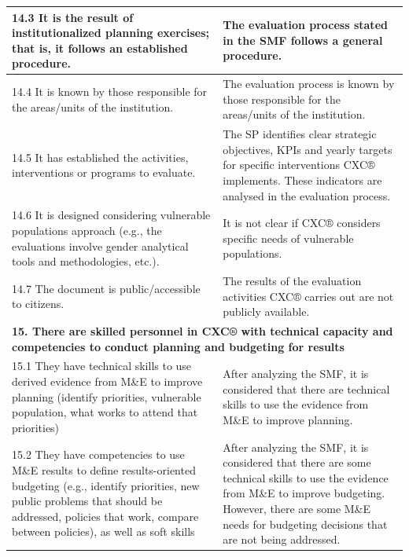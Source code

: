 \documentclass[
  10pt,
]{book}
\begin{document}
\begin{table}
\begin{tabular}[t]{l|l}
\hline
\hspace{1em}14.3 It is the result of institutionalized planning exercises; that is, it follows an established procedure. & The evaluation process stated in the SMF follows a general procedure.\\
\hline
\hspace{1em}14.4 It is known by those responsible for the areas/units of the institution. & The evaluation process is known by those responsible for the areas/units of the institution.\\
\hline
\hspace{1em}14.5 It has established the activities, interventions or programs to evaluate. & The SP identifies clear strategic objectives, KPIs and yearly targets for specific interventions CXC® implements. These indicators are analysed in the evaluation process.\\
\hline
\hspace{1em}14.6 It is designed considering vulnerable populations approach (e.g., the evaluations involve gender analytical tools and methodologies, etc.). & It is not clear if CXC® considers specific needs of vulnerable populations.\\
\hline
\hspace{1em}14.7 The document is public/accessible to citizens. & The results of the evaluation activities CXC® carries out are not publicly available.\\
\hline
\multicolumn{2}{l}{\textbf{15. There are skilled personnel in CXC® with technical capacity and competencies to conduct planning and budgeting for results}}\\
\hline
\hspace{1em}15.1 They have technical skills to use derived evidence from M\&E to improve planning (identify priorities, vulnerable population, what works to attend that priorities) & After analyzing the SMF, it is considered that there are technical skills to use the evidence from M\&E to improve planning.\\
\hline
\hspace{1em}15.2 They have competencies to use M\&E results to define results-oriented budgeting (e.g., identify priorities, new public problems that should be addressed, policies that work, compare between policies), as well as soft skills & After analyzing the SMF, it is considered that there are some technical skills to use the evidence from M\&E to improve budgeting. However, there are some M\&E needs for budgeting decisions that are not being addressed.\\

\end{tabular}
\end{table}
\end{document}
